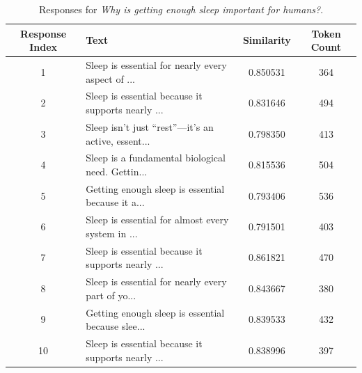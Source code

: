 \documentclass{article}
\begin{document}
\begin{table}[H]
    \centering
    \caption{Responses for \textit{Why is getting enough sleep important for humans?}.}
    \label{tab:getting_enough_sleep}
    \begin{tabular}{c >{\raggedright\arraybackslash}p{8cm} S[table-format=1.6] c}
        \toprule
        Response Index & Text & Similarity & Token Count\\
         & Sleep is essential for nearly every aspect of ... & 0.850531 & 364\\
        2 & Sleep is essential because it supports nearly ... & 0.831646 & 494\\
        3 & Sleep isn’t just “rest”—it’s an active, essent... & 0.798350 & 413\\
        4 & Sleep is a fundamental biological need. Gettin... & 0.815536 & 504\\
        5 & Getting enough sleep is essential because it a... & 0.793406 & 536\\
        6 & Sleep is essential for almost every system in ... & 0.791501 & 403\\
        7 & Sleep is essential because it supports nearly ... & 0.861821 & 470\\
        8 & Sleep is essential for nearly every part of yo... & 0.843667 & 380\\
        9 & Getting enough sleep is essential because slee... & 0.839533 & 432\\
        10 & Sleep is essential because it supports nearly ... & 0.838996 & 397\\
        \bottomrule
    \end{tabular}
\end{table}
\end{document}
